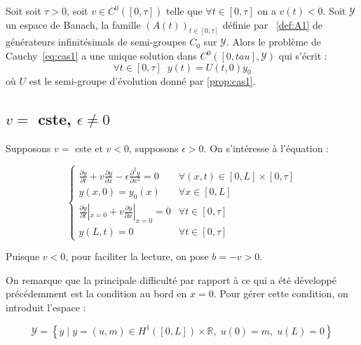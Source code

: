 \documentclass[a4paper]{article}
\newcommand{\dep}{b}
\begin{document}
\begin{theoreme}
	Soit soit $\tau>0$, soit $v \in C^0([0,\tau])$ telle que $\forall t \in [0,\tau]$ on a $v(t)<0$.
	Soit $\mathscr{Y}$ un espace de Banach, la famille $(A(t))_{t \in [0,\tau]}$ 
	définie par ~\eqref{def:A1}
	de générateurs infinitésimals de semi-groupes $C_0$ sur $\mathscr{Y}$.
	Alors le problème de Cauchy~\eqref{eq:cas1} a une unique solution dans $C^0([0,tau],\mathscr{Y})$ qui s'écrit :
	\[ \forall t\in[0,\tau] \; \; y(t) = U(t,0)y_0 \]
	où $U$ est le semi-groupe d'évolution donné par \ref{prop:cas1}.
\end{theoreme}



\vspace{1.0cm}
\subsection{$v =$ cste, $\epsilon \ne 0$}

Supposons $v=$ cste et $v<0$, supposons $\epsilon>0$. 
On s'intéresse à l'équation :


\begin{equation}
\label{eq:cas2}
\begin{cases}
 \displaystyle \frac{\partial y}{\partial t}
 + v \frac{\partial y} {\partial x}  
 - \epsilon \frac{\partial^2 y} {\partial x^2}
 = 0  & \forall (x,t) \in [0,L] \times [0, \tau]\\
 y(x,0) = y_{0} (x) & \forall x \in [0,L] \\
 \displaystyle \frac{\partial y}{\partial t}|_{x=0}
 + v \frac{\partial y} {\partial x}|_{x=0} = 0 & \forall t \in [0,\tau]\\
 y(L,t)=0 & \forall t \in [0,\tau]
\end{cases}
\end{equation}

Puisque $v<0$, pour faciliter la lecture, on pose $\dep = - v >0$.

On remarque que la principale difficulté par rapport à ce qui a été développé 
précédemment est la condition au bord en $x=0$.
Pour gérer cette condition, on introduit l'espace :

\[\mathscr{Y} = \left\{ y \; | \; y = (u,m) \in H^1([0,L])\times \mathbb{R},
 \; u(0)=m, \; u(L)=0 \right\} \]
 
\end{document}
